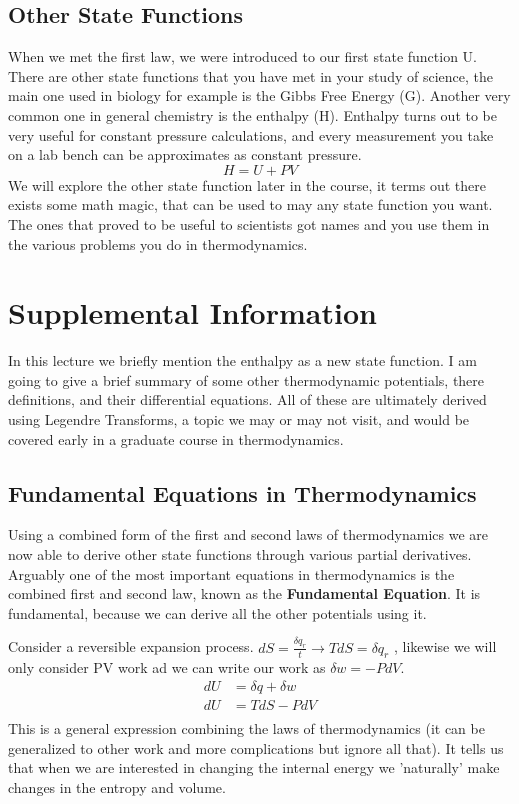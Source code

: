 \documentclass{article}
\begin{document}
\subsection*{Other State Functions}
When we met the first law, we were introduced to our first state function U.
There are other state functions that you have met in your study of science, the main one used in biology for example is the Gibbs Free Energy (G). 
Another very common one in general chemistry is the enthalpy (H). 
Enthalpy turns out to be very useful for constant pressure calculations, and every measurement you take on a lab bench can be approximates as constant pressure. 
\begin{equation}
    H = U + PV
\end{equation}
We will explore the other state function later in the course, it terms out there exists some math magic, that can be used to may any state function you want.
The ones that proved to be useful to scientists got names and you use them in the various problems you do in thermodynamics. 

\section{Supplemental Information}
In this lecture we briefly mention the enthalpy as a new state function. 
I am going to give a brief summary of some other thermodynamic potentials, there definitions, and their differential equations. 
All of these are ultimately derived using Legendre Transforms, a topic we may or may not visit, and would be covered early in a graduate course in thermodynamics. 

\subsection{Fundamental Equations in Thermodynamics}
Using a combined form of the first and second laws of thermodynamics we are now able to derive other state functions through various partial derivatives.
Arguably one of the most important equations in thermodynamics is the combined first and second law, known as the \textbf{Fundamental Equation}. 
It is fundamental, because we can derive all the other potentials using it.

Consider a reversible expansion process. 
$dS =\frac{\delta q_r}{t} \rightarrow TdS = \delta q_r$ , likewise we will only consider PV work ad we can write our work as $\delta w = -PdV$. 
\begin{equation}
    \begin{split}
        dU &= \delta q + \delta w \\
        dU &= TdS - PdV \\
    \end{split}
\end{equation}
This is a general expression combining the laws of thermodynamics (it can be generalized to other work and more complications but ignore all that). 
It tells us that when we are interested in changing the internal energy we 'naturally' make changes in the entropy and volume. 
\end{document}
